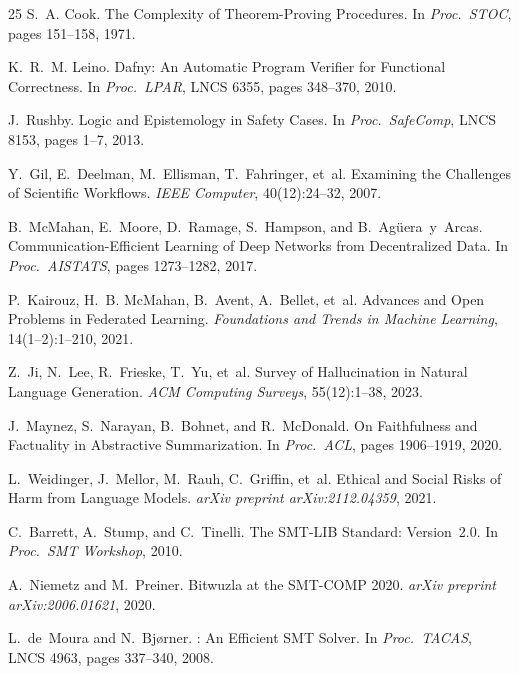 \documentclass[11pt]{article}
\begin{document}
\begin{thebibliography}{25}
S.~A. Cook.
\newblock The Complexity of Theorem-Proving Procedures.
\newblock In \emph{Proc.\ STOC}, pages 151--158, 1971.

K.~R.~M. Leino.
\newblock Dafny: An Automatic Program Verifier for Functional
  Correctness.
\newblock In \emph{Proc.\ LPAR}, LNCS 6355, pages 348--370, 2010.

J.~Rushby.
\newblock Logic and Epistemology in Safety Cases.
\newblock In \emph{Proc.\ SafeComp}, LNCS 8153, pages 1--7, 2013.

Y.~Gil, E.~Deelman, M.~Ellisman, T.~Fahringer, et~al.
\newblock Examining the Challenges of Scientific Workflows.
\newblock \emph{IEEE Computer}, 40(12):24--32, 2007.

B.~McMahan, E.~Moore, D.~Ramage, S.~Hampson, and
  B.~Ag{\"u}era~y~Arcas.
\newblock Communication-Efficient Learning of Deep Networks from
  Decentralized Data.
\newblock In \emph{Proc.\ AISTATS}, pages 1273--1282, 2017.

P.~Kairouz, H.~B. McMahan, B.~Avent, A.~Bellet, et~al.
\newblock Advances and Open Problems in Federated Learning.
\newblock \emph{Foundations and Trends in Machine Learning},
  14(1--2):1--210, 2021.

Z.~Ji, N.~Lee, R.~Frieske, T.~Yu, et~al.
\newblock Survey of Hallucination in Natural Language Generation.
\newblock \emph{ACM Computing Surveys}, 55(12):1--38, 2023.

J.~Maynez, S.~Narayan, B.~Bohnet, and R.~McDonald.
\newblock On Faithfulness and Factuality in Abstractive Summarization.
\newblock In \emph{Proc.\ ACL}, pages 1906--1919, 2020.

L.~Weidinger, J.~Mellor, M.~Rauh, C.~Griffin, et~al.
\newblock Ethical and Social Risks of Harm from Language Models.
\newblock \emph{arXiv preprint arXiv:2112.04359}, 2021.

C.~Barrett, A.~Stump, and C.~Tinelli.
\newblock The {SMT-LIB} Standard: Version~2.0.
\newblock In \emph{Proc.\ SMT Workshop}, 2010.

A.~Niemetz and M.~Preiner.
\newblock Bitwuzla at the {SMT-COMP} 2020.
\newblock \emph{arXiv preprint arXiv:2006.01621}, 2020.

L.~de~Moura and N.~Bj{\o}rner.
: An Efficient {SMT} Solver.
\newblock In \emph{Proc.\ TACAS}, LNCS 4963, pages 337--340, 2008.


\end{thebibliography}
\end{document}
